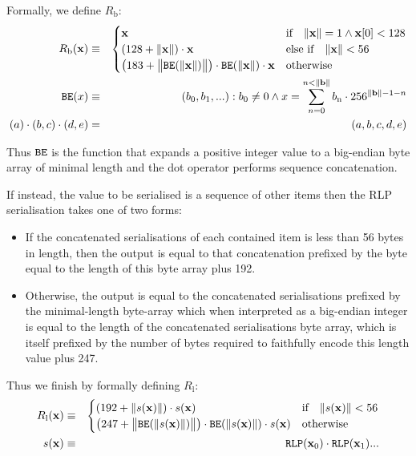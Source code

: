 \documentclass[9pt,oneside]{amsart}
\begin{document}
\hypertarget{RLP_serialisation_of_a_byte_array_R__b_math_def}{}Formally, we define $R_{\mathrm{b}}$:
\begin{eqnarray}
R_{\mathrm{b}}(\mathbf{x}) & \equiv & \begin{cases}
\mathbf{x} & \text{if} \quad \lVert \mathbf{x} \rVert = 1 \wedge \mathbf{x}[0] < 128 \\
(128 + \lVert \mathbf{x} \rVert) \cdot \mathbf{x} & \text{else if} \quad \lVert \mathbf{x} \rVert < 56 \\
\big(183 + \big\lVert \mathtt{\tiny BE}(\lVert \mathbf{x} \rVert) \big\rVert \big) \cdot \mathtt{\tiny BE}(\lVert \mathbf{x} \rVert) \cdot \mathbf{x} & \text{otherwise}
\end{cases} \\
\mathtt{\tiny BE}(x) & \equiv & (b_0, b_1, ...): b_0 \neq 0 \wedge x = \sum_{n = 0}^{n < \lVert \mathbf{b} \rVert} b_{\mathrm{n}} \cdot 256^{\lVert \mathbf{b} \rVert - 1 - n} \\
(a) \cdot (b, c) \cdot (d, e) & = & (a, b, c, d, e)
\end{eqnarray}

Thus $\mathtt{\tiny BE}$ is the function that expands a positive integer value to a big-endian byte array of minimal length and the dot operator performs sequence concatenation.

\hypertarget{RLP_serialisation_of_a_sequence_of_other_items_R__l_word_def}{}If instead, the value to be serialised is a sequence of other items then the RLP serialisation takes one of two forms:

\begin{itemize}
\item If the concatenated serialisations of each contained item is less than 56 bytes in length, then the output is equal to that concatenation prefixed by the byte equal to the length of this byte array plus 192.
\item Otherwise, the output is equal to the concatenated serialisations prefixed by the minimal-length byte-array which when interpreted as a big-endian integer is equal to the length of the concatenated serialisations byte array, which is itself prefixed by the number of bytes required to faithfully encode this length value plus 247.
\end{itemize}

\hypertarget{RLP_serialisation_of_a_sequence_of_other_items_R__l_math_def}{}Thus we finish by formally defining $R_{\mathrm{l}}$:
\begin{eqnarray}
R_{\mathrm{l}}(\mathbf{x}) & \equiv & \begin{cases}
(192 + \lVert s(\mathbf{x}) \rVert) \cdot s(\mathbf{x}) & \text{if} \quad \lVert s(\mathbf{x}) \rVert < 56 \\
\big(247 + \big\lVert \mathtt{\tiny BE}(\lVert s(\mathbf{x}) \rVert) \big\rVert \big) \cdot \mathtt{\tiny BE}(\lVert s(\mathbf{x}) \rVert) \cdot s(\mathbf{x}) & \text{otherwise}
\end{cases} \\
s(\mathbf{x}) & \equiv & \mathtt{\tiny RLP}(\mathbf{x}_0) \cdot \mathtt{\tiny RLP}(\mathbf{x}_1) ...
\end{eqnarray}
\end{document}
